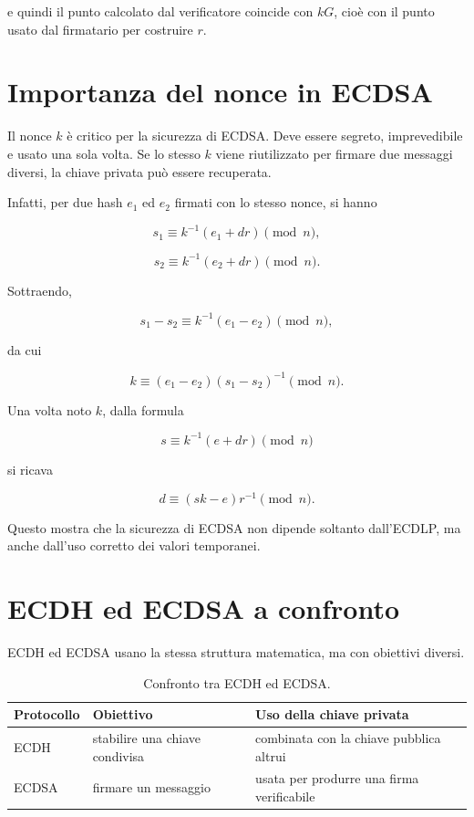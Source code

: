 \documentclass[12pt,a4paper,oneside]{report}
\begin{document}
e quindi il punto calcolato dal verificatore coincide con \(kG\), cioè con il punto usato dal firmatario per costruire \(r\).

\section{Importanza del nonce in ECDSA}

Il nonce \(k\) è critico per la sicurezza di ECDSA. Deve essere segreto, imprevedibile e usato una sola volta. Se lo stesso \(k\) viene riutilizzato per firmare due messaggi diversi, la chiave privata può essere recuperata.

Infatti, per due hash \(e_1\) ed \(e_2\) firmati con lo stesso nonce, si hanno

\[
s_1 \equiv k^{-1}(e_1+dr)\pmod n,
\]

\[
s_2 \equiv k^{-1}(e_2+dr)\pmod n.
\]

Sottraendo,

\[
s_1-s_2\equiv k^{-1}(e_1-e_2)\pmod n,
\]

da cui

\[
k\equiv (e_1-e_2)(s_1-s_2)^{-1}\pmod n.
\]

Una volta noto \(k\), dalla formula

\[
s\equiv k^{-1}(e+dr)\pmod n
\]

si ricava

\[
d\equiv (sk-e)r^{-1}\pmod n.
\]

Questo mostra che la sicurezza di ECDSA non dipende soltanto dall'ECDLP, ma anche dall'uso corretto dei valori temporanei.

\section{ECDH ed ECDSA a confronto}

ECDH ed ECDSA usano la stessa struttura matematica, ma con obiettivi diversi.

\begin{table}[h]
\centering
\begin{tabular}{lll}
\toprule
\textbf{Protocollo} & \textbf{Obiettivo} & \textbf{Uso della chiave privata} \\
\midrule
ECDH & stabilire una chiave condivisa & combinata con la chiave pubblica altrui \\
ECDSA & firmare un messaggio & usata per produrre una firma verificabile \\
\bottomrule
\end{tabular}
\caption{Confronto tra ECDH ed ECDSA.}
\label{tab:ecdh-ecdsa}
\end{table}
\end{document}
